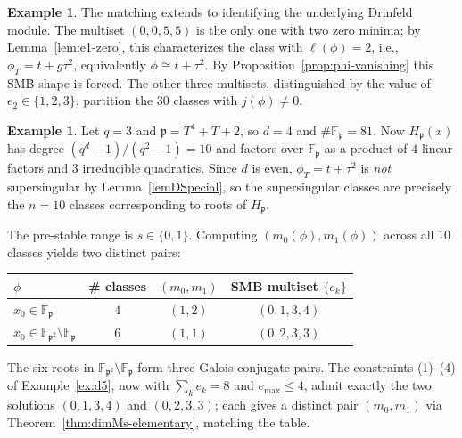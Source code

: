 \documentclass[12pt]{amsart}
\theoremstyle{definition}
\newtheorem{example}[thm]{Example}
\theoremstyle{remark}
\newtheorem{rem}[thm]{Remark}
\numberwithin{equation}{section}
\numberwithin{thm}{section}
\newcommand{\fp}{\mathfrak{p}}
\newcommand{\F}{\mathbb{F}}
\begin{document}
\begin{example}
	The matching extends to identifying the underlying Drinfeld module. The multiset $(0,0,5,5)$ is the only one with two zero minima; by Lemma~\ref{lem:e1-zero}, this characterizes the class with $\ell(\phi) = 2$, i.e., $\phi_T = t + g\tau^2$, equivalently $\phi \cong t + \tau^2$. By Proposition~\ref{prop:phi-vanishing} this SMB shape is forced. The other three multisets, distinguished by the value of $e_2 \in \{1,2,3\}$, partition the $30$ classes with $j(\phi)\neq 0$.
\end{example}

\begin{example}\label{ex:d4}
	Let $q = 3$ and $\fp = T^4 + T + 2$, so $d = 4$ and $\#\F_\fp = 81$. Now $H_\fp(x)$ has degree $(q^d - 1)/(q^2 - 1) = 10$ and factors over $\F_\fp$ as a product of $4$ linear factors and $3$ irreducible quadratics. Since $d$ is even, $\phi_T = t + \tau^2$ is \emph{not} supersingular by Lemma~\ref{lemDSpecial}, so the supersingular classes are precisely the $n = 10$ classes corresponding to roots of $H_\fp$.
	
	The pre-stable range is $s\in\{0,1\}$. Computing $(m_0(\phi), m_1(\phi))$ across all $10$ classes yields two distinct pairs:
	\begin{center}
		\begin{tabular}{lccc}
			\hline
			$\phi$ & \# classes & $(m_0,m_1)$ & SMB multiset $\{e_k\}$ \\
			\hline
			$x_0 \in \F_\fp$ & $4$ & $(1,2)$ & $(0,1,3,4)$ \\
			$x_0 \in \F_{\fp^2}\setminus\F_\fp$ & $6$ & $(1,1)$ & $(0,2,3,3)$ \\
			\hline
		\end{tabular}
	\end{center}
	The six roots in $\F_{\fp^2}\setminus\F_\fp$ form three Galois-conjugate pairs. The constraints (1)--(4) of Example~\ref{ex:d5}, now with $\sum_k e_k = 8$ and $e_{\max}\leq 4$, admit exactly the two solutions $(0,1,3,4)$ and $(0,2,3,3)$; each gives a distinct pair $(m_0,m_1)$ via Theorem~\ref{thm:dimMs-elementary}, matching the table.
\end{example}

	
	
	
	
\end{document}

